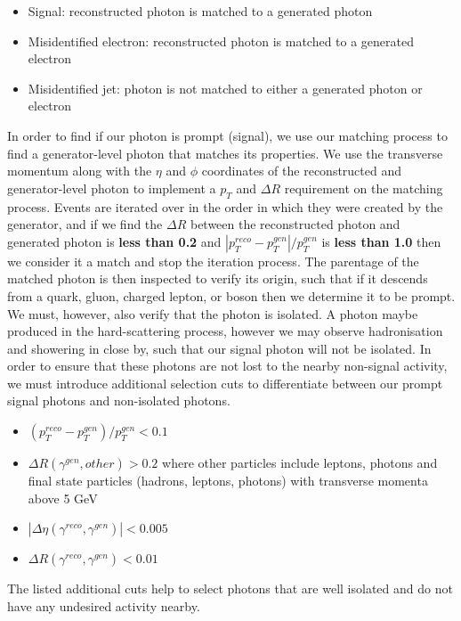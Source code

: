 \begin{itemize}
	\item Signal: reconstructed photon is matched to a generated photon
	\item Misidentified electron: reconstructed photon is matched to a generated electron
	\item Misidentified jet: photon is not matched to either a generated photon or electron
\end{itemize}

In order to find if our photon is prompt (signal), we use our matching process to find a generator-level photon that matches its properties. We use the transverse momentum along with the $\eta$ and $\phi$ coordinates of the reconstructed and generator-level photon to implement a $p_T$ and $\Delta R$ requirement on the matching process. Events are iterated over in the order in which they were created by the generator, and if we find the $\Delta R$ between the reconstructed photon and generated photon is \textbf{less than 0.2} and $|p^{reco}_T - p^{gen}_T|/p^{gen}_T$ is \textbf{less than 1.0} then we consider it a match and stop the iteration process. The parentage of the matched photon is then inspected to verify its origin, such that if it descends from a quark, gluon, charged lepton, or boson then we determine it to be prompt. We must, however, also verify that the photon is isolated. A photon maybe produced in the hard-scattering process, however we may observe hadronisation and showering in close by, such that our signal photon will not be isolated. In order to ensure that these photons are not lost to the nearby non-signal activity, we must introduce additional selection cuts to differentiate between our prompt signal photons and non-isolated photons.  

\begin{itemize}
	\item $\left(p_T^{reco} - p_T^{gen}\right)/p_T^{gen} < 0.1$
	\item $\Delta R ( \gamma^{gen}, other ) > 0.2$ where other particles include leptons, photons and final state
particles (hadrons, leptons, photons) with transverse momenta above 5 GeV
	\item $|\Delta\eta ( \gamma^{reco}, \gamma^{gen} )| < 0.005$
	\item $\Delta R ( \gamma^{reco}, \gamma^{gen} ) < 0.01$
\end{itemize}

The listed additional cuts help to select photons that are well isolated and do not have any undesired activity nearby.

